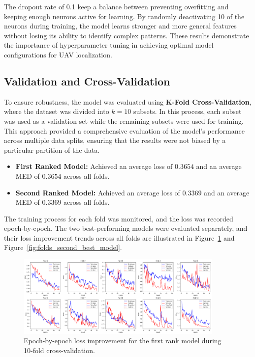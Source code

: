 The dropout rate of 0.1 keep a balance between preventing overfitting and keeping enough neurons active for learning. By randomly deactivating 10 of the neurons during training, the model learns stronger and more general features without losing its ability to identify complex patterns.
These results demonstrate the importance of hyperparameter tuning in achieving optimal model configurations for UAV localization.

\subsection{ Validation and Cross-Validation}
To ensure robustness, the model was evaluated using \textbf{K-Fold Cross-Validation}, where the dataset was divided into \(k = 10\) subsets. In this process, each subset was used as a validation set while the remaining subsets were used for training. This approach provided a comprehensive evaluation of the model's performance across multiple data splits, ensuring that the results were not biased by a particular partition of the data.
\begin{itemize}
    \item \textbf{First Ranked Model:} Achieved an average loss of \(0.3654\) and an average MED of \(0.3654\) across all folds. 
    \item \textbf{Second Ranked Model:} Achieved an average loss of \(0.3369\) and an average MED of \(0.3369\) across all folds. 
\end{itemize}
The training process for each fold was monitored, and the loss was recorded epoch-by-epoch. The two best-performing models were evaluated separately, and their loss improvement trends across all folds are illustrated in Figure~\ref{fig:folds_best_model} and Figure~\ref{fig:folds_second_best_model}.



\begin{figure}[H]
    \centering
    \includegraphics[width=0.9\textwidth]{Imgs/best_model_out.png}
    \caption{Epoch-by-epoch loss improvement for the first rank model during 10-fold cross-validation.}
    \label{fig:folds_best_model}
\end{figure}

